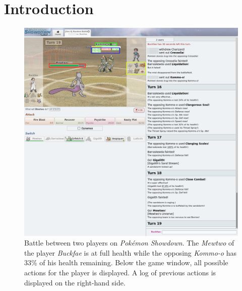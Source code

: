 


\appendix

{}	%
{}	%

\section{Introduction}
\begin{figure}
  \centering
  \includegraphics[width=1\textwidth]{images/Showdown.png}
  \caption{Battle between two players on \textit{Pokémon Showdown}. The \textit{Mewtwo} of the player \textit{Buckfae} is at full
  health while the opposing \textit{Kommo-o} has 33\% of his health remaining. Below the game window, all possible actions
  for the player is displayed. A log of previous actions is displayed on the right-hand side.}
  \label{fig:showdown-battle}
\end{figure}

